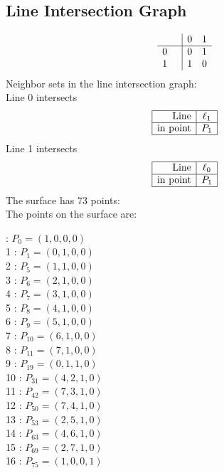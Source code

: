 \documentclass{article}
\begin{document}
{\subsection*{Line Intersection Graph}
{\arraycolsep=1pt
$$
\begin{array}{rr|*{2}r}
 &  & 0 & 1\\
\hline
0 &  & 0 & 1\\
1 &  & 1 & 0\\
\end{array}
$$
}%
Neighbor sets in the line intersection graph:\\
Line 0 intersects 
$$
\begin{array}{|r*{1}{|c}|}
\hline
\mbox{Line}  & \ell_{1}\\
\hline
\mbox{in point}  & P_{1}\\
\hline
\end{array}
$$
Line 1 intersects 
$$
\begin{array}{|r*{1}{|c}|}
\hline
\mbox{Line}  & \ell_{0}\\
\hline
\mbox{in point}  & P_{1}\\
\hline
\end{array}
$$
The surface has 73 points:\\
The points on the surface are:\\
\begin{multicols}{3}
 : $P_{0}=( 1, 0, 0, 0 )$\\
1 : $P_{1}=( 0, 1, 0, 0 )$\\
2 : $P_{5}=( 1, 1, 0, 0 )$\\
3 : $P_{6}=( 2, 1, 0, 0 )$\\
4 : $P_{7}=( 3, 1, 0, 0 )$\\
5 : $P_{8}=( 4, 1, 0, 0 )$\\
6 : $P_{9}=( 5, 1, 0, 0 )$\\
7 : $P_{10}=( 6, 1, 0, 0 )$\\
8 : $P_{11}=( 7, 1, 0, 0 )$\\
9 : $P_{19}=( 0, 1, 1, 0 )$\\
10 : $P_{31}=( 4, 2, 1, 0 )$\\
11 : $P_{42}=( 7, 3, 1, 0 )$\\
12 : $P_{50}=( 7, 4, 1, 0 )$\\
13 : $P_{53}=( 2, 5, 1, 0 )$\\
14 : $P_{63}=( 4, 6, 1, 0 )$\\
15 : $P_{69}=( 2, 7, 1, 0 )$\\
16 : $P_{75}=( 1, 0, 0, 1 )$\\

\end{multicols}}
\end{document}
